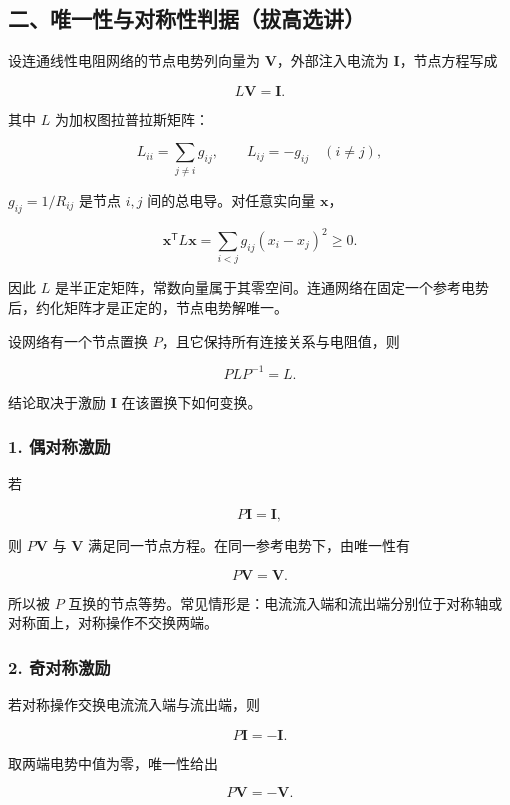 \subsection{二、唯一性与对称性判据（拔高选讲）}\label{m4:ux4e8cux552fux4e00ux6027ux4e0eux5bf9ux79f0ux6027ux5224ux636eux62d4ux9ad8ux9009ux8bb2}

设连通线性电阻网络的节点电势列向量为 \(\mathbf V\)，外部注入电流为
\(\mathbf I\)，节点方程写成

\[
L\mathbf V=\mathbf I.
\]

其中 \(L\) 为加权图拉普拉斯矩阵：

\[
L_{ii}=\sum_{j\ne i}g_{ij},
\qquad
L_{ij}=-g_{ij}\quad(i\ne j),
\]

\(g_{ij}=1/R_{ij}\) 是节点 \(i,j\) 间的总电导。对任意实向量
\(\mathbf x\)，

\[
\mathbf x^{\mathsf T}L\mathbf x
=\sum_{i<j}g_{ij}(x_i-x_j)^2\ge0.
\]

因此 \(L\)
是半正定矩阵，常数向量属于其零空间。连通网络在固定一个参考电势后，约化矩阵才是正定的，节点电势解唯一。

设网络有一个节点置换 \(P\)，且它保持所有连接关系与电阻值，则

\[
PLP^{-1}=L.
\]

结论取决于激励 \(\mathbf I\) 在该置换下如何变换。

\subsubsection{1. 偶对称激励}\label{m4:ux5076ux5bf9ux79f0ux6fc0ux52b1}

若

\[
P\mathbf I=\mathbf I,
\]

则 \(P\mathbf V\) 与 \(\mathbf V\)
满足同一节点方程。在同一参考电势下，由唯一性有

\[
\boxed{P\mathbf V=\mathbf V}.
\]

所以被 \(P\)
互换的节点等势。常见情形是：电流流入端和流出端分别位于对称轴或对称面上，对称操作不交换两端。

\subsubsection{2. 奇对称激励}\label{m4:ux5947ux5bf9ux79f0ux6fc0ux52b1}

若对称操作交换电流流入端与流出端，则

\[
P\mathbf I=-\mathbf I.
\]

取两端电势中值为零，唯一性给出

\[
\boxed{P\mathbf V=-\mathbf V}.
\]

